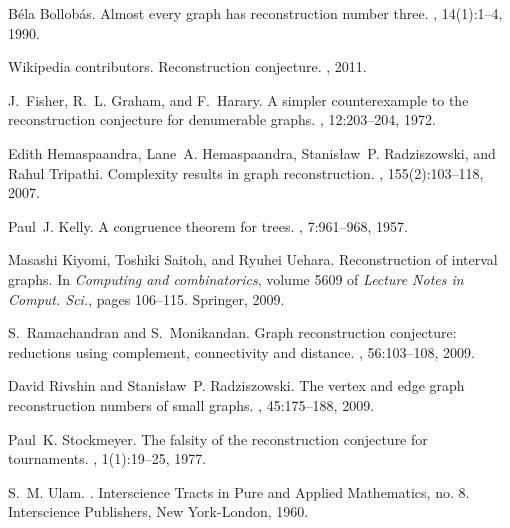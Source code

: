 \documentclass[12pt]{article}
\theoremstyle{plain}
\theoremstyle{definition}
\theoremstyle{remark}
\begin{document}
\begin{thebibliography}{10}

 B{\'e}la Bollob{\'a}s.  \newblock Almost every
  graph has reconstruction number three.  , 14(1):1--4, 1990.

 Wikipedia contributors.  \newblock
  Reconstruction conjecture.  , 2011.

 J.~Fisher, R.~L. Graham, and F.~Harary.  \newblock A
  simpler counterexample to the reconstruction conjecture for
  denumerable graphs.  ,
  12:203--204, 1972.

 Edith Hemaspaandra, Lane~A. Hemaspaandra,
  Stanis{\l}aw~P. Radziszowski, and Rahul Tripathi.  \newblock
  Complexity results in graph reconstruction.  , 155(2):103--118, 2007.

 Paul~J. Kelly.  \newblock A congruence theorem for
  trees.  , 7:961--968, 1957.

 Masashi Kiyomi, Toshiki Saitoh, and Ryuhei Uehara.
  \newblock Reconstruction of interval graphs.  \newblock In {\em
    Computing and combinatorics}, volume 5609 of {\em Lecture Notes in
    Comput. Sci.}, pages 106--115. Springer, 2009.

 S.~Ramachandran and S.~Monikandan.  \newblock Graph
  reconstruction conjecture: reductions using complement, connectivity
  and distance.  ,
  56:103--108, 2009.

 David Rivshin and Stanis{\l}aw~P. Radziszowski.
  \newblock The vertex and edge graph reconstruction numbers of small
  graphs.  , 45:175--188, 2009.

 Paul~K. Stockmeyer.  \newblock The falsity of the
  reconstruction conjecture for tournaments.  , 1(1):19--25, 1977.

 S.~M. Ulam.  .  \newblock Interscience Tracts in Pure and
  Applied Mathematics, no. 8.  Interscience Publishers, New
  York-London, 1960.

\end{thebibliography}
\end{document}
